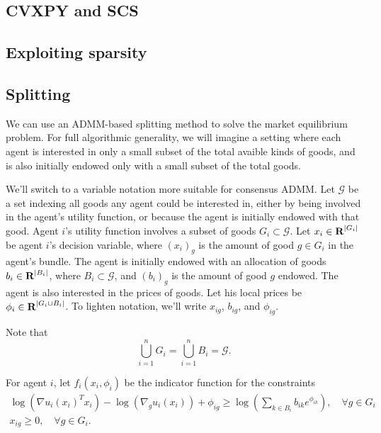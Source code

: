 \documentclass{article}
\begin{document}
\subsection{CVXPY and SCS}
\subsection{Exploiting sparsity}
\subsection{Splitting}



We can use an ADMM-based splitting method to solve the market equilibrium problem.
For full algorithmic generality, we will imagine a setting where each agent 
is interested in only a small subset of the total avaible kinds of goods, and
is also initially endowed only with a small subset of the total goods.

We'll switch to a variable notation more suitable for consensus ADMM.
Let $\mathcal{G}$ be a set indexing all goods any agent could be interested in, 
either by being involved in the agent's utility function, or because the agent is
initially endowed with that good.
Agent $i$'s utility function involves a subset of goods $G_i \subset \mathcal{G}$.
Let $x_i \in {\mbox{\bf R}}^{|G_i|}$ be agent $i$'s decision variable, where
$(x_i)_g$ is the amount of good $g \in G_i$ in the agent's bundle.
The agent is initially endowed with an allocation of goods $b_i \in {\mbox{\bf R}}^{|B_i|}$,
where $B_i \subset \mathcal{G}$, and $(b_i)_g$ is the amount of good $g$ endowed.
The agent is also interested in the prices of goods. Let his local prices
be $\phi_i \in {\mbox{\bf R}}^{|G_i \cup B_i|}$.
To lighten notation, we'll write $x_{ig}$, $b_{ig}$, and $\phi_{ig}$.

Note that
\[
\bigcup_{i=1}^n G_i = \bigcup_{i=1}^n B_i = \mathcal{G}.
\]


For agent $i$, let  $f_i(x_i, \phi_i)$ be the indicator function for the constraints
\[
\begin{array}{c}
\log(\nabla u_i(x_i)^T x_i) - \log(\nabla_g u_i(x_i)) + \phi_{ig} \geq  \log\left(\sum\limits_{k \in B_i} b_{ik} e^{\phi_{ik}}\right),\quad \forall g \in G_i\\
x_{ig} \geq 0, \quad \forall g \in G_i.
\end{array}
\]
\end{document}
